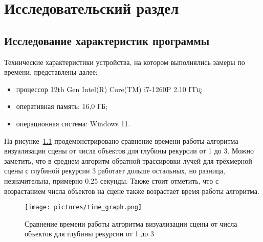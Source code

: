 \chapter{Исследовательский раздел}
\section{Исследование характеристик программы}
Технические характеристики устройства, на котором выполнялись замеры по времени, представлены далее:

\begin{itemize}
	\item процессор 12th Gen Intel(R) Core(TM) i7-1260P 2.10 ГГц;
	\item оперативная память: 16,0 ГБ;
	\item операционная система: Windows 11.
\end{itemize}

На рисунке~\ref{plt:time_01} продемонстрировано сравнение времени работы алгоритма визуализации сцены от числа объектов для глубины рекурсии от 1 до 3. Можно заметить, что в среднем алгоритм обратной трассировки лучей для трёхмерной сцены с глубиной рекурсии 3 работает дольше остальных, но разница, незначительна, примерно 0.25 секунды. Также стоит отметить, что с возрастанием числа объектов на сцене также возрастает время работы алгоритма.
\begin{figure}[h]
	\centering
	\texttt{[image: pictures/time\_graph.png]}
	\caption{Сравнение времени работы алгоритма визуализации сцены от числа объектов для глубины рекурсии от 1 до 3}
	\label{plt:time_01}
\end{figure}
\clearpage
